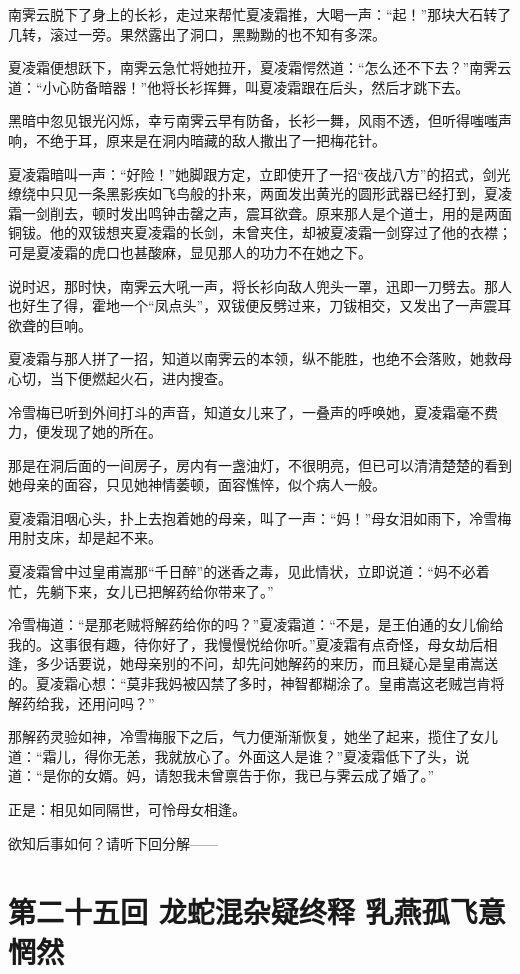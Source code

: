 \documentclass[12pt,oneside]{book}
\begin{document}
南霁云脱下了身上的长衫，走过来帮忙夏凌霜推，大喝一声：``起！''那块大石转了几转，滚过一旁。果然露出了洞口，黑黝黝的也不知有多深。

夏凌霜便想跃下，南霁云急忙将她拉开，夏凌霜愕然道：``怎么还不下去？''南霁云道：``小心防备暗器！''他将长衫挥舞，叫夏凌霜跟在后头，然后才跳下去。

黑暗中忽见银光闪烁，幸亏南霁云早有防备，长衫一舞，风雨不透，但听得嗤嗤声响，不绝于耳，原来是在洞内暗藏的敌人撒出了一把梅花针。

夏凌霜暗叫一声：``好险！''她脚跟方定，立即使开了一招``夜战八方''的招式，剑光缭绕中只见一条黑影疾如飞鸟般的扑来，两面发出黄光的圆形武器已经打到，夏凌霜一剑削去，顿时发出鸣钟击罄之声，震耳欲聋。原来那人是个道士，用的是两面铜钹。他的双钹想夹夏凌霜的长剑，未曾夹住，却被夏凌霜一剑穿过了他的衣襟；可是夏凌霜的虎口也甚酸麻，显见那人的功力不在她之下。

说时迟，那时快，南霁云大吼一声，将长衫向敌人兜头一罩，迅即一刀劈去。那人也好生了得，霍地一个``凤点头''，双钹便反劈过来，刀钹相交，又发出了一声震耳欲聋的巨响。

夏凌霜与那人拼了一招，知道以南霁云的本领，纵不能胜，也绝不会落败，她救母心切，当下便燃起火石，进内搜查。

冷雪梅已听到外间打斗的声音，知道女儿来了，一叠声的呼唤她，夏凌霜毫不费力，便发现了她的所在。

那是在洞后面的一间房子，房内有一盏油灯，不很明亮，但已可以清清楚楚的看到她母亲的面容，只见她神情萎顿，面容憔悴，似个病人一般。

夏凌霜泪咽心头，扑上去抱着她的母亲，叫了一声：``妈！''母女泪如雨下，冷雪梅用肘支床，却是起不来。

夏凌霜曾中过皇甫嵩那``千日醉''的迷香之毒，见此情状，立即说道：``妈不必着忙，先躺下来，女儿已把解药给你带来了。''

冷雪梅道：``是那老贼将解药给你的吗？''夏凌霜道：``不是，是王伯通的女儿偷给我的。这事很有趣，待你好了，我慢慢悦给你听。''夏凌霜有点奇怪，母女劫后相逢，多少话要说，她母亲别的不问，却先问她解药的来历，而且疑心是皇甫嵩送的。夏凌霜心想：``莫非我妈被囚禁了多时，神智都糊涂了。皇甫嵩这老贼岂肯将解药给我，还用问吗？''

那解药灵验如神，冷雪梅服下之后，气力便渐渐恢复，她坐了起来，揽住了女儿道：``霜儿，得你无恙，我就放心了。外面这人是谁？''夏凌霜低下了头，说道：``是你的女婿。妈，请恕我未曾禀告于你，我已与霁云成了婚了。''

正是：相见如同隔世，可怜母女相逢。

欲知后事如何？请听下回分解------

\chapter{第二十五回 龙蛇混杂疑终释
乳燕孤飞意惘然}\label{ux7b2cux4e8cux5341ux4e94ux56de-ux9f99ux86c7ux6df7ux6742ux7591ux7ec8ux91ca-ux4e73ux71d5ux5b64ux98deux610fux60d8ux7136}
\end{document}
